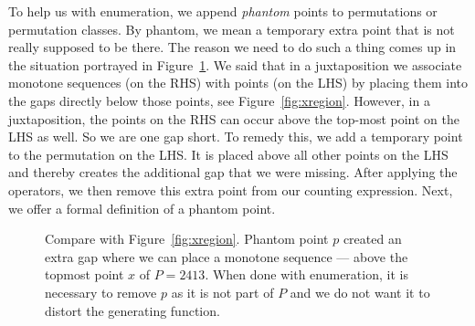 \documentclass[12pt, a4paper, twoside]{report}
\begin{document}
To help us with enumeration, we append \emph{phantom} points to permutations or permutation classes. By phantom, we mean a temporary extra point that is not really supposed to be there. The reason we need to do such a thing comes up in the situation portrayed in Figure~\ref{fig:illustrate_phantom_pt}. We said that in a juxtaposition we associate monotone sequences (on the RHS) with points (on the LHS) by placing them into the gaps directly below those points, see Figure~\ref{fig:xregion}. However, in a juxtaposition, the points on the RHS can occur above the top-most point on the LHS as well. So we are one gap short. To remedy this, we add a temporary point to the permutation on the LHS. It is placed above all other points on the LHS and thereby creates the additional gap that we were missing. After applying the operators, we then remove this extra point from our counting expression. Next, we offer a formal definition of a phantom point.
\begin{figure}[ht!]
 \centering
  \caption{Compare with Figure~\ref{fig:xregion}. Phantom point $p$ created an extra gap where we can place a monotone sequence --- above the topmost point $x$ of $P=2413$. When done with enumeration, it is necessary to remove $p$ as it is not part of $P$ and we do not want it to distort the generating function.}
  \label{fig:illustrate_phantom_pt}
\end{figure}
\end{document}
